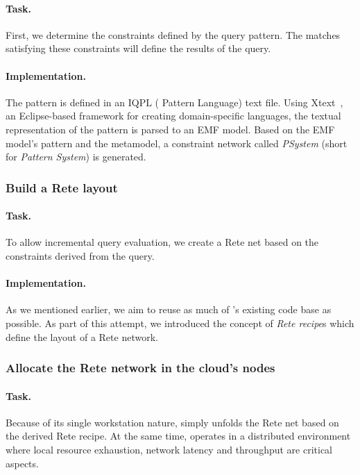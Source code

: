 \paragraph{Task.} First, we determine the constraints defined by the query pattern. The matches satisfying these constraints will define the results of the query.

\paragraph{Implementation.} The pattern is defined in an IQPL (\iq{} Pattern Language) text file. Using Xtext~\cite{Xtext}, an Eclipse-based framework for creating domain-specific languages, the textual representation of the pattern is parsed to an EMF model. Based on the EMF model's pattern and the metamodel, a constraint network called \textit{PSystem} (short for \textit{Pattern System}) is generated. 

\subsubsection{Build a Rete layout}

\paragraph{Task.} To allow incremental query evaluation, we create a Rete net based on the constraints derived from the query.

\paragraph{Implementation.} As we mentioned earlier, we aim to reuse as much of \eiq{}'s existing code base as possible. As part of this attempt, we introduced the concept of \textit{Rete recipe}s which define the layout of a Rete network.    

\subsubsection{Allocate the Rete network in the cloud's nodes} 

\paragraph{Task.} Because of its single workstation nature, \eiq{} simply unfolds the Rete net based on the derived Rete recipe. At the same time, \iqd{} operates in a distributed environment where local resource exhaustion, network latency and throughput are critical aspects. 

